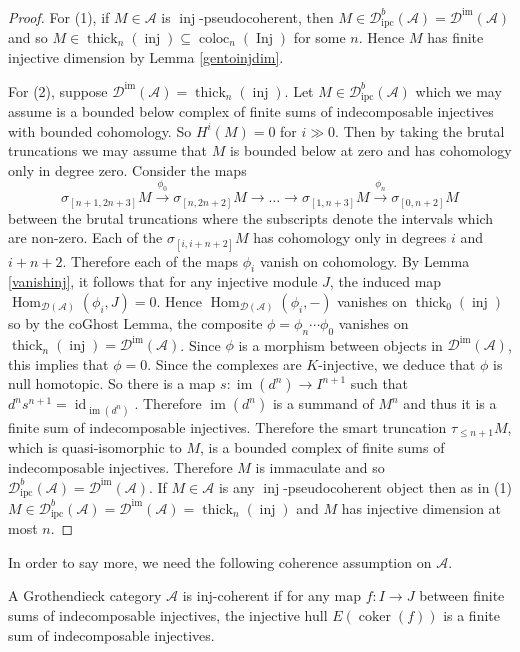 \documentclass[12pt,oneside]{amsart}
\DeclareMathOperator*{\Inj}{Inj}
\DeclareMathOperator{\coloc}{coloc}
\DeclareMathOperator*{\coker}{coker}
\DeclareMathOperator{\im}{im}
\DeclareMathOperator{\Hom}{Hom}
\DeclareMathOperator{\thick}{thick}
\DeclareMathOperator{\id}{id}
\DeclareMathOperator{\inj}{inj}
\DeclareMathOperator{\immac}{im}
\DeclareMathOperator{\ipscoh}{ipc}
\begin{document}
\begin{proof}
For (1), if $M \in \mathcal{A}$ is $\inj$-pseudocoherent, then $M \in \mathcal{D}^b_{\ipscoh}(\mathcal{A}) = \mathcal{D}^{\immac}(\mathcal{A})$ and so $M \in \thick_n(\inj) \subseteq \coloc_n(\Inj)$ for some $n$. Hence $M$ has finite injective dimension by Lemma \ref{gentoinjdim}.

For (2), suppose $\mathcal{D}^{\immac}(\mathcal{A}) = \thick_n(\inj)$. Let $M \in \mathcal{D}^b_{\ipscoh}(\mathcal{A})$ which we may assume is a bounded below complex of finite sums of indecomposable injectives with bounded cohomology. So  $H^i(M) = 0$ for $i \gg 0$. Then by taking the brutal truncations we may assume that $M$ is bounded below at zero and has cohomology only in degree zero. Consider the maps
\[
\sigma_{[n+1,2n+3]}M \xrightarrow{\phi_0} \sigma_{[n,2n+2]} M \to \dots \to  \sigma_{[1,n+3]} M \xrightarrow{\phi_n} \sigma_{[0,n+2]} M
\]
between the brutal truncations where the subscripts denote the intervals which are non-zero. Each of the $\sigma_{[i,i+n+2]} M$ has cohomology only in degrees $i$ and $i+n+2$. Therefore each of the maps $\phi_i$ vanish on cohomology. By Lemma \ref{vanishinj}, it follows that for any injective module $J$, the induced map $\Hom_{\mathcal{D}(\mathcal{A})}(\phi_i,J) = 0$. Hence $\Hom_{\mathcal{D}(\mathcal{A})}(\phi_i,-)$ vanishes on $\thick_0(\inj)$ so by the coGhost Lemma, the composite $\phi= \phi_n \cdots \phi_0$ vanishes on $\thick_{n}(\inj) = \mathcal{D}^{\immac
}(\mathcal{A})$. Since $\phi$ is a morphism between objects in $\mathcal{D}^{\immac
}(\mathcal{A})$, this implies that $\phi = 0$. Since the complexes are $K$-injective, we deduce that $\phi$ is null homotopic. So there is a map $s: \im(d^n) \to I^{n+1}$ such that $d^n s^{n+1} = \id_{\im(d^n)}$. Therefore $\im(d^n)$ is a summand of $M^n$ and thus it is a finite sum of indecomposable injectives. Therefore the smart truncation $\tau_{\leq n+1} M$, which is quasi-isomorphic to $M$, is a bounded complex of finite sums of indecomposable injectives. Therefore $M$ is immaculate and so $\mathcal{D}^b_{\ipscoh}(\mathcal{A}) = \mathcal{D}^{\immac}(\mathcal{A})$. If $M \in \mathcal{A}$ is any $\inj$-pseudocoherent object then as in (1) $M \in \mathcal{D}^b_{\ipscoh}(\mathcal{A}) = \mathcal{D}^{\immac}(\mathcal{A}) = \thick_n(\inj)$ and $M$ has injective dimension at most $n$. 
\end{proof}

In order to say more, we need the following coherence assumption on $\mathcal{A}$. 

\begin{defn} \label{injcohdefn}
A Grothendieck category $\mathcal{A}$ is inj-coherent if for any map $f: I \to J$ between finite sums of indecomposable injectives, the injective hull $E(\coker(f))$ is a finite sum of indecomposable injectives.
\end{defn}
\end{document}
